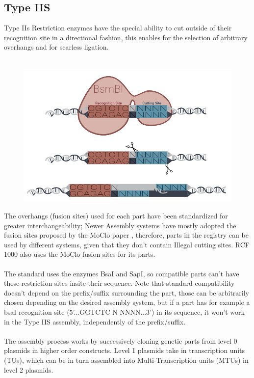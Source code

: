 \subsection{Type IIS}
Type IIs Restriction enzymes have the special ability to cut outside of their recognition site in a directional fashion, this enables for the selection of arbitrary overhangs and for scarless ligation. \\ \\

\begin{figure}[!htbp]
    \centering
    \includegraphics[width=\textwidth]{images/chap4/chap4_rfc1000.png}
    \label{fig:ch4rfc1000}
\end{figure}
\FloatBarrier

 \noindent
The overhangs (fusion sites) used for each part have been standardized for greater interchangeability; Newer Assembly systems have mostly adopted the fusion sites proposed by the MoClo paper \parencite{Weber2011}, therefore, parts in the registry can be used by different systems, given that they don’t contain Illegal cutting sites. RCF 1000 also uses the MoClo fusion sites for its parts. \\ \\
The standard uses the enzymes BsaI and SapI, so compatible parts can’t have these restriction sites insite their sequence. Note that standard compatibility doesn’t depend on the prefix/suffix surrounding the part, those can be arbitrarily chosen depending on the desired assembly system, but if a part has for example a bsaI recognition site (5'...GGTCTC N NNNN...3’) in its sequence, it won’t work in the Type IIS assembly, independently of the prefix/suffix. \\ \\
The assembly process works by successively cloning genetic parts from level 0 plasmids in higher order constructs. Level 1 plasmids take in transcription units (TUs), which can be in turn assembled into Multi-Transcription units (MTUs) in level 2 plasmids.

